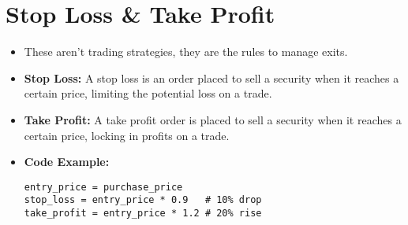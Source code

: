 \documentclass{article}
\begin{document}
\section*{Stop Loss \& Take Profit}
\begin{itemize}
    \item These aren't trading strategies, they are the rules to manage exits.
    \item \textbf{Stop Loss:} A stop loss is an order placed to sell a security when it reaches a certain price, limiting the potential loss on a trade.
    \item \textbf{Take Profit:} A take profit order is placed to sell a security when it reaches a certain price, locking in profits on a trade. 
    \item \textbf{Code Example:}
    \begin{lstlisting}
entry_price = purchase_price
stop_loss = entry_price * 0.9   # 10% drop
take_profit = entry_price * 1.2 # 20% rise


\end{lstlisting}
\end{itemize}
\end{document}
